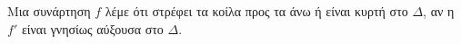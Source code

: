 Μια συνάρτηση $ f $ λέμε ότι στρέφει τα κοίλα προς τα άνω ή είναι κυρτή στο $ \Delta $, αν η $ f' $ είναι γνησίως αύξουσα στο $ \Delta $.
